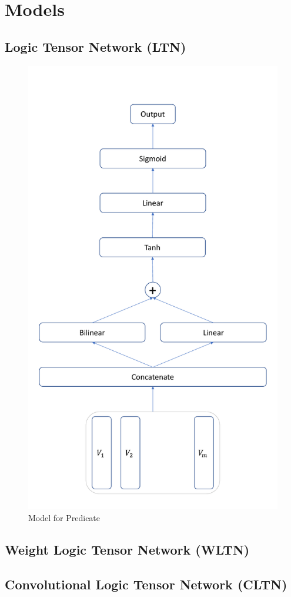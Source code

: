 
\section{Models}

\subsection{Logic Tensor Network (LTN)}

\begin{figure}
    \centering
    \includegraphics[width=.3\textwidth]{img/Predicate.pdf}
    \caption{Model for Predicate}
    \label{fig:model_predicate}
\end{figure}


\subsection{Weight Logic Tensor Network (WLTN)}

\subsection{Convolutional Logic Tensor Network (CLTN)}

